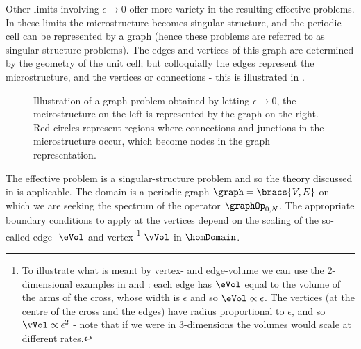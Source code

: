 Other limits involving $\epsilon\rightarrow0$ offer more variety in the resulting effective problems.
In these limits the microstructure becomes singular structure, and the periodic cell can be represented by a graph (hence these problems are referred to as singular structure problems).
The edges and vertices of this graph are determined by the geometry of the unit cell; but colloquially the edges represent the  microstructure, and the vertices  or connections - this is illustrated in .
\begin{figure}[b!]
	\centering
	\caption{Illustration of a graph problem obtained by letting $\epsilon\rightarrow0$, the mcirostructure on the left is represented by the graph on the right. Red circles represent regions where connections and junctions in the microstructure occur, which become nodes in the graph representation.  \label{fig:StrucToGraphExample}}
\end{figure}
The effective problem is a singular-structure problem and so the theory discussed in  is applicable.
The domain is a periodic graph $\graph = \bracs{V, E}$ on which we are seeking the spectrum of the operator $\graphOp_{0, N}$.
The appropriate boundary conditions to apply at the vertices depend on the scaling of the so-called edge- $\eVol$ and vertex-\footnote{To illustrate what is meant by vertex- and edge-volume we can use the 2-dimensional examples in  and : each edge has $\eVol$ equal to the volume of the arms of the cross, whose width is $\epsilon$ and so $\eVol\propto\epsilon$. The vertices (at the centre of the cross and the edges) have radius proportional to $\epsilon$, and so $\vVol\propto\epsilon^{2}$ - note that if we were in 3-dimensions the volumes would scale at different rates.} $\vVol$ \cite{exner2005convergence} in $\homDomain$.
